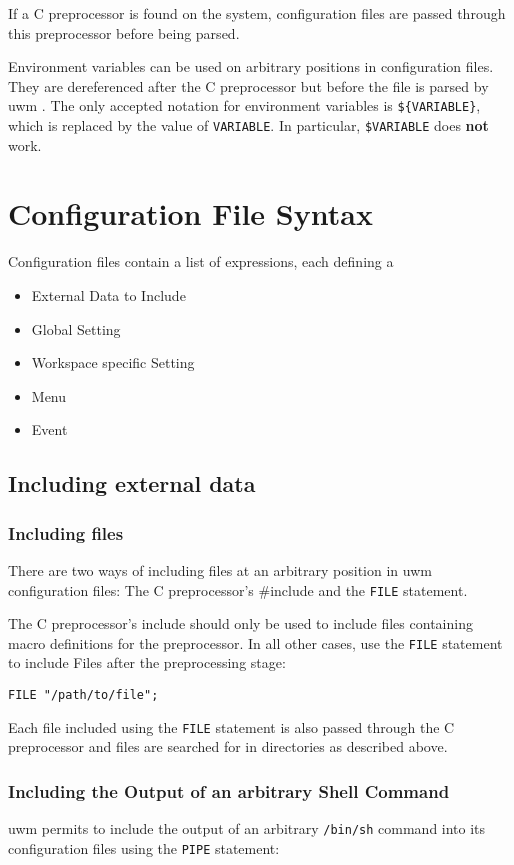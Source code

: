 \documentclass[10pt,a4paper]{article}
\newcommand{\uwm}{{\sc uwm} }
\begin{document}
If a C preprocessor is found on the system, configuration files are passed
through this preprocessor before being parsed.

Environment variables can be used on arbitrary positions in configuration
files. They are dereferenced after the C preprocessor but before the file is
parsed by \uwm. The only accepted notation for environment variables is
\texttt{\$\{VARIABLE\}}, which is replaced by the value of \texttt{VARIABLE}.
In particular, \texttt{\$VARIABLE} does \textbf{not} work.

\section{Configuration File Syntax}
Configuration files contain a list of expressions, each defining a
\begin{itemize}
\item External Data to Include
\item Global Setting
\item Workspace specific Setting
\item Menu
\item Event
\end{itemize}

\subsection{Including external data}
\subsubsection{Including files}
There are two ways of including files at an arbitrary position in uwm
configuration files: The C preprocessor's \#include and the \texttt{FILE}
statement.

The C preprocessor's include should only be used to include files containing
macro definitions for the preprocessor. In all other cases, use the
\texttt{FILE} statement to include Files after the preprocessing stage:

\begin{verbatim}
FILE "/path/to/file";
\end{verbatim}

Each file included using the \texttt{FILE} statement is also passed through
the C preprocessor and files are searched for in directories as described
above.

\subsubsection{Including the Output of an arbitrary Shell Command}
\uwm permits to include the output of an arbitrary \texttt{/bin/sh}
command into its configuration files using the \texttt{PIPE} statement:
\end{document}
